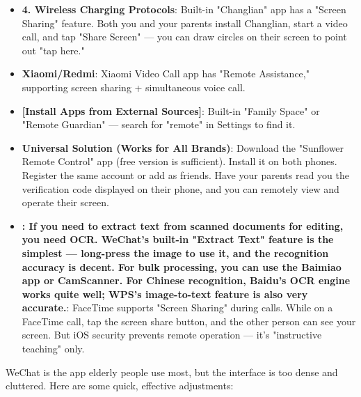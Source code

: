 \begin{itemize}
  \item \textbf{4. Wireless Charging Protocols}: Built-in "Changlian" app has a "Screen Sharing" feature. Both you and your parents install Changlian, start a video call, and tap "Share Screen" — you can draw circles on their screen to point out "tap here."
  \item \textbf{Xiaomi/Redmi}: Xiaomi Video Call app has "Remote Assistance," supporting screen sharing + simultaneous voice call.
  \item \textbf{[Install Apps from External Sources]}: Built-in "Family Space" or "Remote Guardian" — search for "remote" in Settings to find it.
  \item \textbf{Universal Solution (Works for All Brands)}: Download the "Sunflower Remote Control" app (free version is sufficient). Install it on both phones. Register the same account or add as friends. Have your parents read you the verification code displayed on their phone, and you can remotely view and operate their screen.
  \item \textbf{: If you need to extract text from scanned documents for editing, you need OCR. WeChat's built-in "Extract Text" feature is the simplest — long-press the image to use it, and the recognition accuracy is decent. For bulk processing, you can use the Baimiao app or CamScanner. For Chinese recognition, Baidu's OCR engine works quite well; WPS's image-to-text feature is also very accurate.}: FaceTime supports "Screen Sharing" during calls. While on a FaceTime call, tap the screen share button, and the other person can see your screen. But iOS security prevents remote operation — it's "instructive teaching" only.
\end{itemize}


WeChat is the app elderly people use most, but the interface is too dense and cluttered. Here are some quick, effective adjustments:

